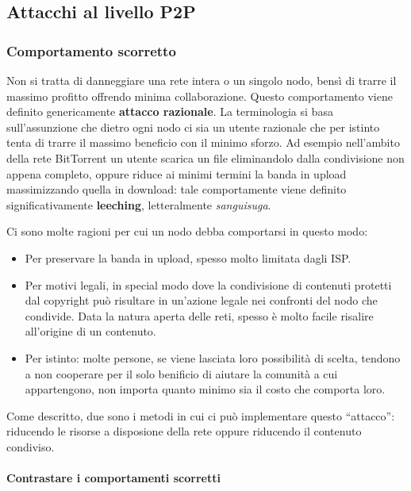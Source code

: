 \subsection{Attacchi al livello P2P}\label{attacchi-al-livello-p2p}

\subsubsection{Comportamento scorretto}\label{comportamento-scorretto}

Non si tratta di danneggiare una rete intera o un singolo nodo, bensì di
trarre il massimo profitto offrendo minima collaborazione. Questo
comportamento viene definito genericamente \textbf{attacco razionale}.
La terminologia si basa sull'assunzione che dietro ogni nodo ci sia un
utente razionale che per istinto tenta di trarre il massimo beneficio
con il minimo sforzo. Ad esempio nell'ambito della rete BitTorrent un
utente scarica un file eliminandolo dalla condivisione non appena
completo, oppure riduce ai minimi termini la banda in upload
massimizzando quella in download: tale comportamente viene definito
significativamente \textbf{leeching}, letteralmente \emph{sanguisuga}.

Ci sono molte ragioni per cui un nodo debba comportarsi in questo modo:

\begin{itemize}
\itemsep1pt\parskip0pt
\item
  Per preservare la banda in upload, spesso molto limitata dagli ISP.
\item
  Per motivi legali, in special modo dove la condivisione di contenuti
  protetti dal copyright può risultare in un'azione legale nei confronti
  del nodo che condivide. Data la natura aperta delle reti, spesso è
  molto facile risalire all'origine di un contenuto.
\item
  Per istinto: molte persone, se viene lasciata loro possibilità di
  scelta, tendono a non cooperare per il solo benificio di aiutare la
  comunità a cui appartengono, non importa quanto minimo sia il costo
  che comporta loro.
\end{itemize}

Come descritto, due sono i metodi in cui ci può implementare questo
``attacco'': riducendo le risorse a disposione della rete oppure
riducendo il contenuto condiviso.

\paragraph{Contrastare i comportamenti
scorretti}\label{contrastare-i-comportamenti-scorretti}

